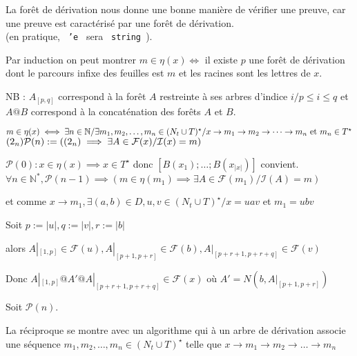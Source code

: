 \documentclass[a4paper,12pt]{article}
\newcommand{\norm}[1]{\lvert #1 \rvert}
\newlength{\mydepth}
\newlength{\myheight}
\newenvironment{answer}
{\par\begin{lrbox}{\mybox}\quad\begin{minipage}{\linewidth}\color{black}\setlength{\parskip}{10pt plus 1pt minus 1pt}\vspace*{-.7\baselineskip}}
{\end{minipage}\end{lrbox}
\settodepth{\mydepth}{\usebox{\mybox}}
\settoheight{\myheight}{\usebox{\mybox}}
\addtolength{\myheight}{\mydepth}
\noindent\makebox[0pt]{
  \color{gray}\hspace{-0pt}\rule[-\mydepth]{1pt}{\myheight}}
  \usebox{\mybox}
  }
\begin{document}
La forêt de dérivation nous donne une bonne manière de vérifier une preuve, car une preuve est caractérisé par une forêt de dérivation.\\

(en pratique, \texttt{ 'e } sera \texttt{ string }).

Par induction on peut montrer $m \in \eta(x) \iff $ il existe $p$ une forêt de dérivation dont le parcours infixe des feuilles est $m$ et les racines sont les lettres de $x$.

{\color{gray} NB : $A_{[p,q]}$ correspond à la forêt $A$ restreinte à ses arbres d'indice $i / p\leq i \leq q$ et $A@B$ correspond à la concaténation des forêts $A$ et $B$. }\\

\begin{answer} 
$
m \in \eta(x)\\
\iff \exists n \in \mathbb{N} / \exists m_1,m_2,\dots,m_n \in (N_t \cup T)^\star / x \rightarrow m_1 \rightarrow m_2 \rightarrow \dots \rightarrow m_n\text{ et }m_n \in T^\star$    $ (2_n)\\
\mathcal{P}(n) := ((2_n) \implies \exists A \in \mathcal{F}(x) / \mathcal{I}(x) = m)$\\
\begin{answer} 
$\mathcal{P}(0) : x \in \eta(x) \implies x \in T^\star$ donc $[B (x_1);\dots;B (x_{\norm{x}})]$ convient.\\
$\forall n \in \mathbb{N}^*,\mathcal{P}(n-1) \implies (m \in \eta(m_1) \implies \exists A \in \mathcal{F}(m_1)/ \mathcal{I}(A) = m)$

 et comme $x\rightarrow m_1,\exists (a,b) \in D, u,v\in (N_t\cup T)^\star /x = uav$ et $m_1 = ubv$

 Soit $p := \norm{u}, q := \norm{v}, r := \norm{b}$
 
 alors $A|_{[1,p]} \in \mathcal{F}(u), A|_{[p+1,p+r]} \in \mathcal{F}(b), A|_{[p+r+1,p+r+q]} \in \mathcal{F}(v)$

 Donc $A|_{[1,p]}@A'@A|_{[p+r+1,p+r+q]}\in \mathcal{F}(x)$ où $A' = N (b,A|_{[p+1,p+r]})$

 Soit $\mathcal{P}(n)$.
\end{answer}
\end{answer}
La réciproque se montre avec un algorithme qui à un arbre de dérivation associe une séquence $m_1,m_2,\dots,m_n \in (N_t \cup T)^\star$ telle que $x \rightarrow m_1 \rightarrow m_2 \rightarrow \dots \rightarrow m_n$
\end{document}
